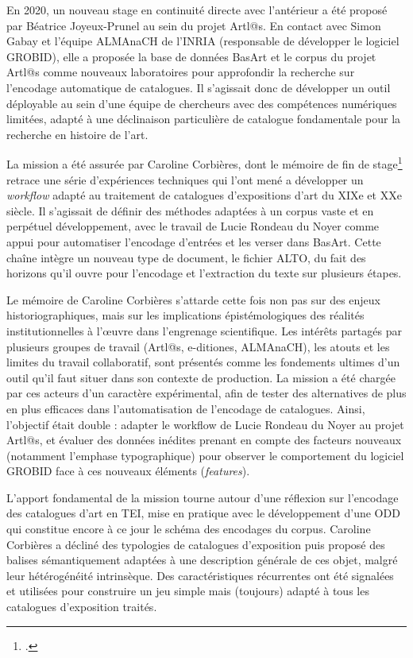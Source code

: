 \documentclass[a4paper,12pt,twoside]{book}
\begin{document}
En 2020, un nouveau stage en continuité directe avec l'antérieur a été proposé par Béatrice Joyeux-Prunel au sein du projet Artl@s. En contact avec Simon Gabay et l'équipe ALMAnaCH de l'INRIA (responsable de développer le logiciel GROBID), elle a proposée la base de données BasArt et le corpus du projet Artl@s comme nouveaux laboratoires pour approfondir la recherche sur l'encodage automatique de catalogues. Il s'agissait donc de développer un outil déployable au sein d'une équipe de chercheurs avec des compétences numériques limitées, adapté à une déclinaison particulière de catalogue fondamentale pour la recherche en histoire de l'art.

La mission a été assurée par Caroline Corbières, dont le mémoire de fin de stage\footcite{corbieres_du_2020} retrace une série d'expériences techniques qui l'ont mené a développer un \textit{workflow} adapté au traitement de catalogues d'expositions d'art du XIXe et XXe siècle. Il s'agissait de définir des méthodes adaptées à un corpus vaste et en perpétuel développement, avec le travail de Lucie Rondeau du Noyer comme appui pour automatiser l'encodage d'entrées et les verser dans BasArt. Cette chaîne intègre un nouveau type de document, le fichier ALTO, du fait des horizons qu'il ouvre pour l'encodage et l'extraction du texte sur plusieurs étapes.

Le mémoire de Caroline Corbières s'attarde cette fois non pas sur des enjeux historiographiques, mais sur les implications épistémologiques des réalités institutionnelles à l'œuvre dans l'engrenage scientifique. Les intérêts partagés par plusieurs groupes de travail (Artl@s, e-ditiones, ALMAnaCH), les atouts et les limites du travail collaboratif, sont présentés comme les fondements ultimes d'un outil qu'il faut situer dans son contexte de production. La mission a été chargée par ces acteurs d'un caractère expérimental, afin de tester des alternatives de plus en plus efficaces dans l'automatisation de l'encodage de catalogues. Ainsi, l'objectif était double : adapter le workflow de Lucie Rondeau du Noyer au projet Artl@s, et évaluer des données inédites prenant en compte des facteurs nouveaux (notamment l'emphase typographique) pour observer le comportement du logiciel GROBID face à ces nouveaux éléments (\textit{features}).

L'apport fondamental de la mission tourne autour d'une réflexion sur l'encodage des catalogues d'art en TEI, mise en pratique avec le développement d'une ODD qui constitue encore à ce jour le schéma des encodages du corpus. Caroline Corbières a décliné des typologies de catalogues d'exposition puis proposé des balises sémantiquement adaptées à une description générale de ces objet, malgré leur hétérogénéité intrinsèque. Des caractéristiques récurrentes ont été signalées et utilisées pour construire un jeu simple mais (toujours) adapté à tous les catalogues d'exposition traités. 
\end{document}
